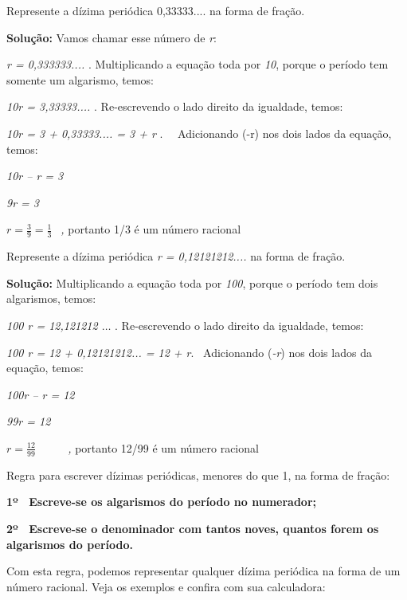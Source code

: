 \begin{texemplo}
Represente a dízima periódica 0,33333.... na forma de fração.

\textbf{Solução: }Vamos chamar esse número de \textit{r}:

\quad \textit{r = 0,333333....} . Multiplicando a equação toda por \textit{10}, porque o período tem somente um algarismo, temos:

\quad \textit{10r = 3,33333....} . Re-escrevendo o lado direito da igualdade, temos:

\quad \textit{10r = 3 + 0,33333.... = 3 + r} .~~ Adicionando (-r) nos dois lados da equação, temos:

\quad \textit{10r – r = 3}

\quad \textit{9r = 3}

\quad  \( r=\frac{3}{9}=\frac{1}{3}~~ \) \textit{, }portanto 1/3 é um número racional\textit{ \qedsymbol{}}

\end{texemplo}

\begin{texemplo}
Represente a dízima periódica \textit{r = 0,12121212....} na forma de fração.

\textbf{Solução: }Multiplicando a equação toda por \textit{100}, porque o período tem dois algarismos, temos:

\quad \textit{100 r = 12,121212 $ \ldots $ } . Re-escrevendo o lado direito da igualdade, temos:\quad 

\quad \textit{100 r = 12 + 0,12121212... = 12 + r}.~ Adicionando (\textit{-r}) nos dois lados da equação, temos:

\quad \textit{100r – r = 12}

\textit{\quad 99r = 12}

\quad  \( r=\frac{12}{99}~~~ \) \textit{~~~ ,} portanto 12/99 é um número racional\textit{\qedsymbol{}}
\end{texemplo}
\quad Regra para escrever dízimas periódicas, menores do que 1, na forma de fração:

\begin{caixa}

\textbf{1º~  Escreve-se os algarismos do período no numerador;}

\textbf{2º~  Escreve-se o denominador com tantos noves, quantos forem os algarismos do período.}

\end{caixa}
\quad Com esta regra, podemos representar qualquer dízima periódica na forma de um número racional. Veja os exemplos e confira com sua calculadora:

